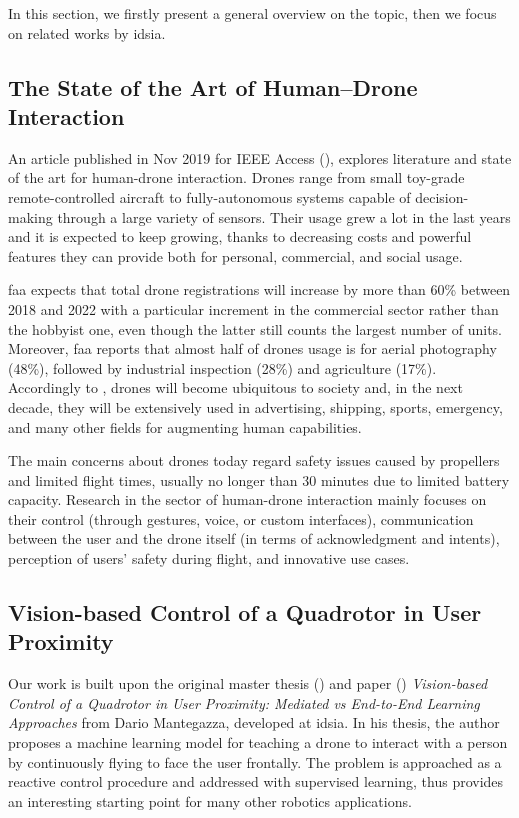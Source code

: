 In this section, we firstly present a general overview on the topic, then we focus on related works by \gls{idsia}.



\subsection{The State of the Art of Human–Drone Interaction}
\label{subsec:human-drone-sota}

An article published in Nov 2019 for IEEE Access (\cite{human-drone-sota}), explores literature and state of the art for human-drone interaction. Drones range from small toy-grade remote-controlled aircraft to fully-autonomous systems capable of decision-making through a large variety of sensors. Their usage grew a lot in the last years and it is expected to keep growing, thanks to decreasing costs and powerful features they can provide both for personal, commercial, and social usage.

\gls{faa} expects that total drone registrations will increase by more than 60\% between 2018 and 2022 with a particular increment in the commercial sector rather than the hobbyist one, even though the latter still counts the largest number of units. Moreover, \gls{faa} reports that almost half of drones usage is for aerial photography (48\%), followed by industrial inspection (28\%) and agriculture (17\%). Accordingly to \cite{human-drone-sota}, drones will become ubiquitous to society and, in the next decade, they will be extensively used in advertising, shipping, sports, emergency, and many other fields for augmenting human capabilities.

The main concerns about drones today regard safety issues caused by propellers and limited flight times, usually no longer than 30 minutes due to limited battery capacity. Research in the sector of human-drone interaction mainly focuses on their control (through gestures, voice, or custom interfaces), communication between the user and the drone itself (in terms of acknowledgment and intents), perception of users' safety during flight, and innovative use cases. 



\subsection{Vision-based Control of a Quadrotor in User Proximity}
\label{subsec:sota-dario}

Our work is built upon the original master thesis (\cite{mantegazza2018thesis}) and paper (\cite{mantegazza2019visionbased}) \textit{Vision-based Control of a Quadrotor in User Proximity: Mediated vs End-to-End Learning Approaches} from Dario Mantegazza, developed at \gls{idsia}. In his thesis, the author proposes a machine learning model for teaching a drone to interact with a person by continuously flying to face the user frontally. The problem is approached as a reactive control procedure and addressed with supervised learning, thus provides an interesting starting point for many other robotics applications. 

